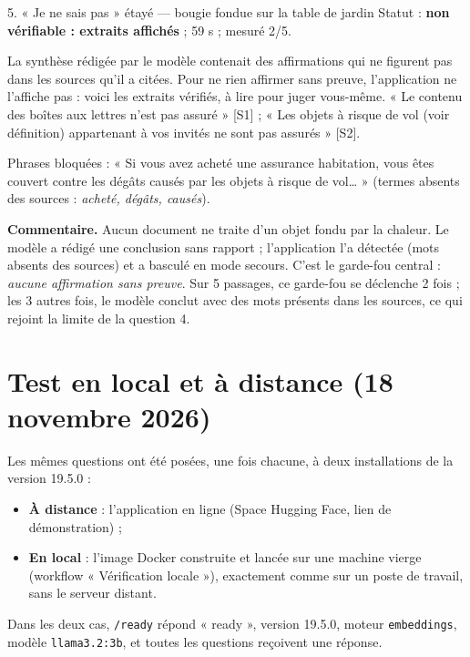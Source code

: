 \documentclass[11pt,a4paper]{article}
\begin{document}
\begin{question}{5. « Je ne sais pas » étayé — bougie fondue sur la table de jardin}
Statut : \textbf{non vérifiable : extraits affichés} ; 59 s ; mesuré 2/5.
\begin{reponse}
La synthèse rédigée par le modèle contenait des affirmations qui ne figurent pas dans les sources
qu'il a citées. Pour ne rien affirmer sans preuve, l'application ne l'affiche pas : voici les
extraits vérifiés, à lire pour juger vous-même.
« Le contenu des boîtes aux lettres n'est pas assuré » [S1] ; « Les objets à risque de vol (voir
définition) appartenant à vos invités ne sont pas assurés » [S2].
\end{reponse}
Phrases bloquées : « Si vous avez acheté une assurance habitation, vous êtes couvert contre les
dégâts causés par les objets à risque de vol… » (termes absents des sources : \emph{acheté, dégâts,
causés}).

\smallskip\textbf{Commentaire.} Aucun document ne traite d'un objet fondu par la chaleur. Le
modèle a rédigé une conclusion sans rapport ; l'application l'a détectée (mots absents des
sources) et a basculé en mode secours. C'est le garde-fou central : \emph{aucune affirmation sans
preuve}. Sur 5 passages, ce garde-fou se déclenche 2 fois ; les 3 autres fois, le modèle conclut
avec des mots présents dans les sources, ce qui rejoint la limite de la question 4.
\end{question}

\section{Test en local et à distance (18 novembre 2026)}
Les mêmes questions ont été posées, une fois chacune, à deux installations de la version 19.5.0 :
\begin{itemize}
\item \textbf{À distance} : l'application en ligne (Space Hugging Face, lien de démonstration) ;
\item \textbf{En local} : l'image Docker construite et lancée sur une machine vierge
(workflow « Vérification locale »), exactement comme sur un poste de travail, sans le serveur
distant.
\end{itemize}
Dans les deux cas, \texttt{/ready} répond « ready », version 19.5.0, moteur \texttt{embeddings},
modèle \texttt{llama3.2:3b}, et toutes les questions reçoivent une réponse.
\end{document}
